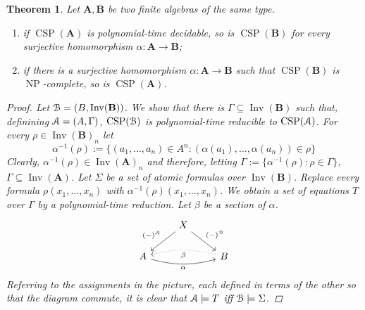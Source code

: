 \documentclass{amsart}
\theoremstyle{plain}
\newtheorem{theorem}{Theorem}[section]
\theoremstyle{definition}
\theoremstyle{remark}
\DeclareMathOperator{\CSP}{CSP}
\DeclareMathOperator{\Inv}{Inv}
\DeclareMathOperator{\NP}{NP}
\begin{document}
\begin{theorem}
    \label{homo}
    Let $\mathbf{A}, \mathbf{B}$ be two finite algebras of the same type.  
    \begin{enumerate}
        \item if $\CSP(\mathbf{A})$ is polynomial-time decidable, so is $\CSP(\mathbf{B})$ for every surjective homomorphism $\alpha: \mathbf{A} \to \mathbf{B}$; 
        \item if there is a surjective homomorphism $\alpha: \mathbf{A} \to \mathbf{B}$ such that $\CSP(\mathbf{B})$ is $\NP$-complete, so is $\CSP(\mathbf{A})$. 
    \end{enumerate}
    \begin{proof}
        Let $\EuScript{B}=(B, \Inv(\mathbf{B}))$.
        We show that there is $\Gamma \subseteq \Inv(\mathbf{B})$ such that, definining $\EuScript{A}=(A, \Gamma)$, $\CSP(\EuScript{B})$ is polynomial-time reducible to $\CSP(\EuScript{A})$. 
        For every $\rho \in \Inv(\mathbf{B})_n$ let 
        \begin{equation*}
            \alpha^{-1}(\rho):=\{(a_1, \ldots, a_n) \in A^n : (\alpha(a_1), \ldots, \alpha(a_n)) \in \rho\}
        \end{equation*}
        Clearly, $\alpha^{-1}(\rho) \in \Inv(\mathbf{A})_n$
        and therefore, letting $\Gamma:=\{\alpha^{-1}(\rho) : \rho \in \Gamma\}$, $\Gamma \subseteq \Inv(\mathbf{A})$. 
        Let $\Sigma$ be a set of atomic formulas over $\Inv(\mathbf{B})$. 
        Replace every formula $\rho(x_1, \ldots, x_n)$ with $\alpha^{-1}(\rho)(x_1, \ldots, x_n)$.       
        We obtain a set of equations $T$ over $\Gamma$ by a polynomial-time reduction. 
        Let $\beta$ be a section of $\alpha$.  
        \begin{equation*}
            \begin{tikzcd}
                & X \arrow[dl, "(-)^{\EuScript{A}}", swap] \arrow[dr, "(-)^{\EuScript{B}}"] & \\
                A \arrow[rr, bend right=15, "\alpha", swap] & & B \arrow[ll, bend right=15, dotted, "\beta"]
            \end{tikzcd}
        \end{equation*}
        Referring to the assignments in the picture, each defined in terms of the other so that the diagram commute, 
        it is clear that $\EuScript{A} \models T$ iff $\EuScript{B} \models \Sigma$. 
    \end{proof}
\end{theorem}
\end{document}
